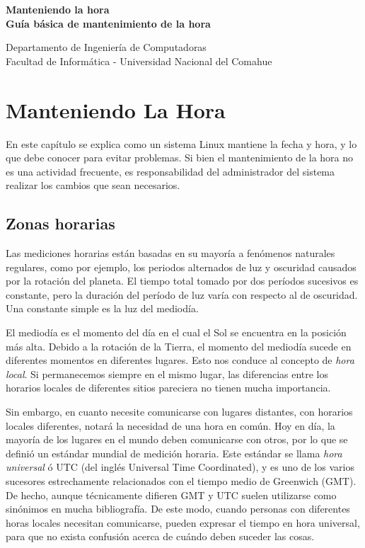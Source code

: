 \documentclass[12pt]{article}
\def\maketitle{

 \makeatletter
 {\color{bl} \centering \huge \sc \textbf{
 Manteniendo la hora \\ 
\large \vspace*{-8pt} \color{black} Guía básica de mantenimiento de la hora
 \vspace*{8pt} }\par}
 \makeatother


 \makeatletter
 {\centering \small 
 	Departamento de Ingeniería de Computadoras \\
 	Facultad de Informática - Universidad Nacional del Comahue \\
 	\vspace{20pt} }
 \makeatother

}
\begin{document}
\thispagestyle{empty}
\maketitle
\setlength{\parindent}{0pt}

\section*{ Manteniendo La Hora}

En este capítulo se explica como un sistema Linux mantiene la fecha y hora,
y lo que debe conocer para evitar problemas. Si bien el mantenimiento de
la hora no es una actividad frecuente, es responsabilidad del administrador 
del sistema realizar los cambios que sean necesarios. 


\subsection*{Zonas horarias}

Las mediciones horarias están basadas en su mayoría a fenómenos naturales regulares,
como por ejemplo, los periodos alternados de luz y oscuridad
causados por la rotación del planeta. El tiempo total tomado por dos períodos
sucesivos es constante, pero la duración del período de luz varía
con respecto al de oscuridad. Una constante simple es la luz del mediodía.

El mediodía es el momento del día en el cual el Sol se encuentra en la posición más alta. 
Debido a la rotación de la Tierra, el momento del mediodía sucede en diferentes 
momentos en diferentes lugares. Esto nos conduce al concepto de \textit{hora local}.
Si permanecemos siempre en el mismo lugar, las diferencias entre los
horarios locales de diferentes sitios pareciera no tienen mucha importancia.

Sin embargo, en cuanto necesite comunicarse con lugares distantes, con horarios locales 
diferentes, notará la necesidad de una hora en común. Hoy en día, la mayoría de los lugares en el mundo deben
comunicarse con otros, por lo que se definió un estándar mundial de medición
horaria. Este estándar se llama \textit{hora universal} ó UTC (del inglés Universal 
Time Coordinated), y es uno de los varios sucesores estrechamente 
relacionados con el tiempo medio de Greenwich (GMT). De hecho, aunque técnicamente 
difieren GMT y UTC suelen utilizarse como sinónimos en mucha bibliografía.   
De este modo, cuando personas con diferentes horas locales
necesitan comunicarse, pueden expresar el tiempo en hora universal,
para que no exista confusión acerca de cuándo deben suceder las cosas.
\end{document}
